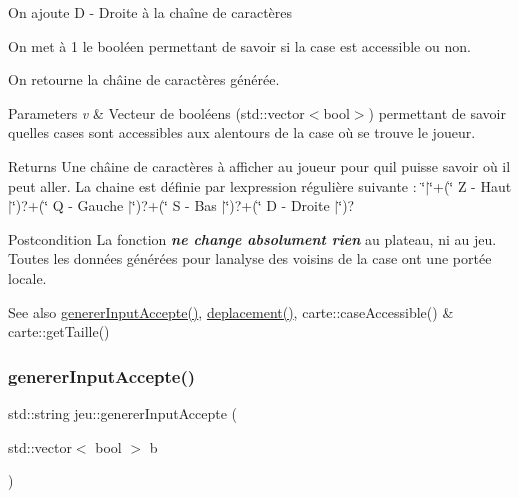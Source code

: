 \begin{DoxyItemize}
\begin{DoxyItemize}
\item On ajoute {\ttfamily D -\/ Droite} à la chaîne de caractères
\item On met à 1 le booléen permettant de savoir si la case est accessible ou non.
\end{DoxyItemize}
\item On retourne la châine de caractères générée. 
\begin{DoxyParams}{Parameters}
{\em v} & Vecteur de booléens ({\ttfamily std\+::vector$<$bool$>$}) permettant de savoir quelles cases sont accessibles aux alentours de la case où se trouve le joueur. \\
\hline
\end{DoxyParams}
\begin{DoxyReturn}{Returns}
Une châine de caractères à afficher au joueur pour qu\textquotesingle{}il puisse savoir où il peut aller. La chaine est définie par l\textquotesingle{}expression régulière suivante \+: {\ttfamily \char`\"{}$\vert$\char`\"{}+(\char`\"{} Z -\/ Haut $\vert$\char`\"{})?+(\char`\"{} Q -\/ Gauche $\vert$\char`\"{})?+(\char`\"{} S -\/ Bas $\vert$\char`\"{})?+(\char`\"{} D -\/ Droite $\vert$\char`\"{})?} 
\end{DoxyReturn}
\begin{DoxyPostcond}{Postcondition}
La fonction {\itshape {\bfseries ne change absolument rien}} au plateau, ni au jeu. Toutes les données générées pour l\textquotesingle{}analyse des voisins de la case ont une portée locale. 
\end{DoxyPostcond}
\begin{DoxySeeAlso}{See also}
\hyperlink{classjeu_ae186e98661e72378c9e659ffcf7a7deb}{generer\+Input\+Accepte()}, \hyperlink{classjeu_a852b0a8b2d17f0af120c6798861ef806}{deplacement()}, carte\+::case\+Accessible() \& carte\+::get\+Taille() 
\end{DoxySeeAlso}

\end{DoxyItemize}\mbox{\label{classjeu_ae186e98661e72378c9e659ffcf7a7deb}} 
\subsubsection{\texorpdfstring{generer\+Input\+Accepte()}{genererInputAccepte()}}
{\footnotesize\ttfamily std\+::string jeu\+::generer\+Input\+Accepte (\begin{DoxyParamCaption}\item[{std\+::vector$<$ bool $>$}]{b }\end{DoxyParamCaption})}



